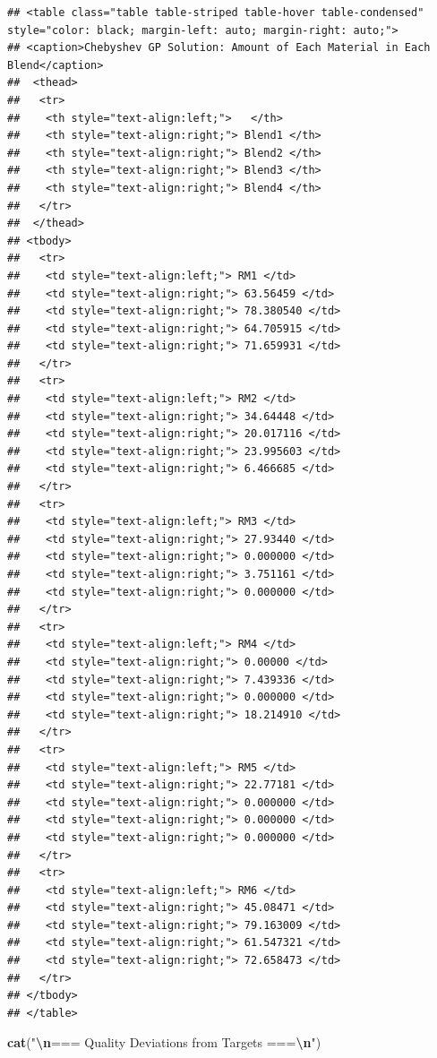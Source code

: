 \documentclass[
]{article}
\newenvironment{Shaded}{\begin{snugshade}}{\end{snugshade}}
\newcommand{\FunctionTok}[1]{\textcolor[rgb]{0.13,0.29,0.53}{\textbf{#1}}}
\newcommand{\NormalTok}[1]{#1}
\newcommand{\SpecialCharTok}[1]{\textcolor[rgb]{0.81,0.36,0.00}{\textbf{#1}}}
\newcommand{\StringTok}[1]{\textcolor[rgb]{0.31,0.60,0.02}{#1}}
\begin{document}
\begin{verbatim}
## <table class="table table-striped table-hover table-condensed" style="color: black; margin-left: auto; margin-right: auto;">
## <caption>Chebyshev GP Solution: Amount of Each Material in Each Blend</caption>
##  <thead>
##   <tr>
##    <th style="text-align:left;">   </th>
##    <th style="text-align:right;"> Blend1 </th>
##    <th style="text-align:right;"> Blend2 </th>
##    <th style="text-align:right;"> Blend3 </th>
##    <th style="text-align:right;"> Blend4 </th>
##   </tr>
##  </thead>
## <tbody>
##   <tr>
##    <td style="text-align:left;"> RM1 </td>
##    <td style="text-align:right;"> 63.56459 </td>
##    <td style="text-align:right;"> 78.380540 </td>
##    <td style="text-align:right;"> 64.705915 </td>
##    <td style="text-align:right;"> 71.659931 </td>
##   </tr>
##   <tr>
##    <td style="text-align:left;"> RM2 </td>
##    <td style="text-align:right;"> 34.64448 </td>
##    <td style="text-align:right;"> 20.017116 </td>
##    <td style="text-align:right;"> 23.995603 </td>
##    <td style="text-align:right;"> 6.466685 </td>
##   </tr>
##   <tr>
##    <td style="text-align:left;"> RM3 </td>
##    <td style="text-align:right;"> 27.93440 </td>
##    <td style="text-align:right;"> 0.000000 </td>
##    <td style="text-align:right;"> 3.751161 </td>
##    <td style="text-align:right;"> 0.000000 </td>
##   </tr>
##   <tr>
##    <td style="text-align:left;"> RM4 </td>
##    <td style="text-align:right;"> 0.00000 </td>
##    <td style="text-align:right;"> 7.439336 </td>
##    <td style="text-align:right;"> 0.000000 </td>
##    <td style="text-align:right;"> 18.214910 </td>
##   </tr>
##   <tr>
##    <td style="text-align:left;"> RM5 </td>
##    <td style="text-align:right;"> 22.77181 </td>
##    <td style="text-align:right;"> 0.000000 </td>
##    <td style="text-align:right;"> 0.000000 </td>
##    <td style="text-align:right;"> 0.000000 </td>
##   </tr>
##   <tr>
##    <td style="text-align:left;"> RM6 </td>
##    <td style="text-align:right;"> 45.08471 </td>
##    <td style="text-align:right;"> 79.163009 </td>
##    <td style="text-align:right;"> 61.547321 </td>
##    <td style="text-align:right;"> 72.658473 </td>
##   </tr>
## </tbody>
## </table>
\end{verbatim}

\begin{Shaded}
\begin{Highlighting}[]
\FunctionTok{cat}\NormalTok{(}\StringTok{"}\SpecialCharTok{\textbackslash{}n}\StringTok{=== Quality Deviations from Targets ===}\SpecialCharTok{\textbackslash{}n}\StringTok{"}\NormalTok{)}
\end{Highlighting}
\end{Shaded}
\end{document}
